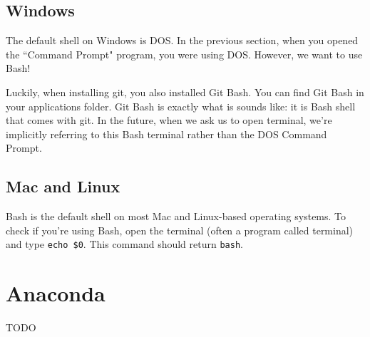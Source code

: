 \documentclass[12pt]{article}
\numberwithin{equation}{section}
\begin{document}
	\subsection{Windows}
	The default shell on Windows is DOS.  In the previous section, when you opened the ``Command Prompt" program, you were using DOS. However, we want to use Bash!
	
	Luckily, when installing git, you also installed Git Bash. You can find Git Bash in your applications folder. Git Bash is exactly what is sounds like: it is Bash shell that comes with git. In the future, when we ask us to open terminal, we're implicitly referring to this Bash terminal rather than the DOS Command Prompt.
	
	\subsection{Mac and Linux}
	Bash is the default shell on most Mac and Linux-based operating systems. To check if you're using Bash, open the terminal (often a program called terminal) and type \verb|echo $0|. This command should return \verb|bash|. 
	
	\section{Anaconda}
	
	TODO
\end{document}
